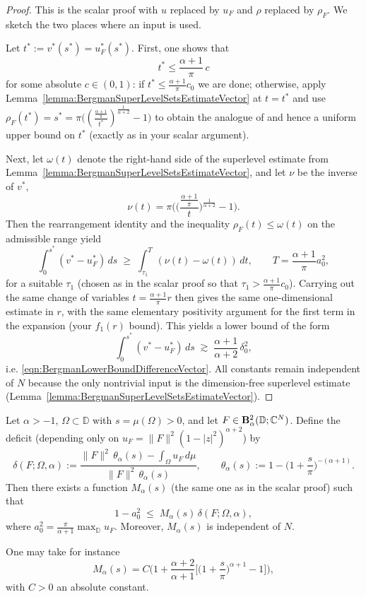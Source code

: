 \documentclass[a4paper,10pt]{amsart}
\newcommand{\D}{\mathbb{D}}
\begin{document}
\begin{proof}
This is the scalar proof with $u$ replaced by $u_F$ and $\rho$ replaced by $\rho_F$.
We sketch the two places where an input is used.

Let $t^*:=v^*(s^*)=u_F^*(s^*)$. First, one shows that
\[
t^*\le \frac{\alpha+1}{\pi}\,c
\]
for some absolute $c\in(0,1)$: if $t^*\le \frac{\alpha+1}{\pi}c_0$ we are done;
otherwise, apply Lemma~\ref{lemma:BergmanSuperLevelSetsEstimateVector} at $t=t^*$ and use
$\rho_F(t^*)=s^*=\pi\big((\frac{\frac{\alpha+1}{\pi}}{t^*})^{\frac1{\alpha+2}}-1\big)$
to obtain the analogue of \cite[eq.~3.16]{GomezKalajMelentijevicRamos2025} and hence a uniform
upper bound on $t^*$ (exactly as in your scalar argument).

Next, let $\omega(t)$ denote the right-hand side of the superlevel estimate from
Lemma~\ref{lemma:BergmanSuperLevelSetsEstimateVector}, and let $\nu$ be the inverse of $v^*$,
\[
\nu(t)=\pi\Big(\Big(\frac{\frac{\alpha+1}{\pi}}{t}\Big)^{\frac1{\alpha+2}}-1\Big).
\]
Then the rearrangement identity and the inequality $\rho_F(t)\le \omega(t)$ on the admissible
range yield
\[
\int_0^{s^*}(v^*-u_F^*)\,ds
\;\ge\;
\int_{\tau_1}^{T}(\nu(t)-\omega(t))\,dt,
\qquad
T=\frac{\alpha+1}{\pi}a_0^2,
\]
for a suitable $\tau_1$ (chosen as in the scalar proof so that $\tau_1>\frac{\alpha+1}{\pi}c_0$).
Carrying out the same change of variables $t=\frac{\alpha+1}{\pi}r$ then gives the same
one-dimensional estimate in $r$, with the same elementary positivity argument for the first
term in the expansion (your $f_1(r)$ bound). This yields a lower bound of the form
\[
\int_0^{s^*}(v^*-u_F^*)\,ds \;\gtrsim\; \frac{\alpha+1}{\alpha+2}\,\delta_0^2,
\]
i.e. \eqref{eqn:BergmanLowerBoundDifferenceVector}.
All constants remain independent of $N$ because the only nontrivial input is the
dimension-free superlevel estimate (Lemma~\ref{lemma:BergmanSuperLevelSetsEstimateVector}).
\end{proof}


\begin{numlemma}\label{lemma:BergmanFunctionStabilityBeforeRKHSVector}
Let $\alpha>-1$, $\Omega\subset\D$ with $s=\mu(\Omega)>0$, and let
$F\in \mathbf B_\alpha^2(\D;\C^N)$.
Define the deficit (depending only on $u_F=\|F\|^2(1-|z|^2)^{\alpha+2}$) by
\[
\delta(F;\Omega,\alpha)
:=
\frac{\|F\|^2\,\theta_\alpha(s)-\int_\Omega u_F\,d\mu}{\|F\|^2\,\theta_\alpha(s)},
\qquad
\theta_\alpha(s):=1-\Big(1+\frac{s}{\pi}\Big)^{-(\alpha+1)}.
\]
Then there exists a function $M_\alpha(s)$ (the same one as in the scalar proof) such that
\begin{equation}\label{eqn:BergmanFunctionStabilityBeforeRKHSVector}
1-a_0^2 \;\le\; M_\alpha(s)\,\delta(F;\Omega,\alpha),
\end{equation}
where \(a_0^2=\frac{\pi}{\alpha+1}\max_\D u_F\).
Moreover, $M_\alpha(s)$ is independent of $N$.

One may take for instance
\[
M_\alpha(s)=C\Big(1+\frac{\alpha+2}{\alpha+1}\Big[\Big(1+\frac{s}{\pi}\Big)^{\alpha+1}-1\Big]\Big),
\]
with $C>0$ an absolute constant.
\end{numlemma}
\end{document}
